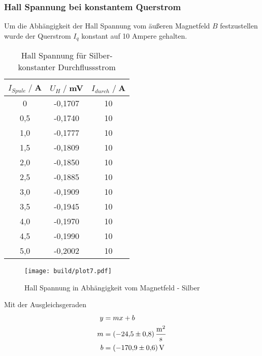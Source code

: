 \subsubsection{Hall Spannung bei konstantem Querstrom}
Um die Abhängigkeit der Hall Spannung vom äußeren Magnetfeld $B$ festzustellen wurde der Querstrom $I_q$ konstant auf 10 Ampere gehalten.
\begin{table}[H]
    \centering
    \begin{tabular}{c c c}
        \toprule
        $I_{Spule} \;/\;$A & $U_H\;/\;$mV & $I_{durch} \;/\;$A\\
        \midrule
            0                   &-0,1707&             10\\
            0,5                 &-0,1740&             10\\
            1,0                 &-0,1777&             10\\
            1,5                 &-0,1809&             10\\
            2,0                 &-0,1850&             10\\
            2,5                 &-0,1885&             10\\
            3,0                 &-0,1909&             10\\
            3,5                 &-0,1945&             10\\
            4,0                 &-0,1970&             10\\
            4,5                 &-0,1990&             10\\
            5,0                 &-0,2002&             10\\
       \bottomrule
    \end{tabular}
    \caption{Hall Spannung für Silber- konstanter Durchflussstrom}
    \label{tab:Ag_I}
\end{table}
\begin{figure}[H]
    \centering
    \texttt{[image: build/plot7.pdf]}
    \caption{Hall Spannung in Abhängigkeit vom Magnetfeld - Silber}
    \label{fig:Ag_B}
\end{figure}
Mit der Ausgleichsgeraden
\begin{align*}
    y &= mx + b\\
    m &= \SI{-24,5 \pm 0,8}{\square \meter \per \second} \\
    b &= \SI{-170,9 \pm 0,6}{\volt} \\ 
\end{align*}

